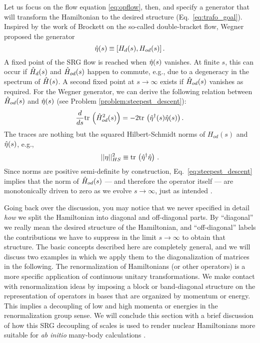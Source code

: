 {Let us focus on the flow equation \eqref{eq:opflow}, then, and specify a
generator that will transform the Hamiltonian to the desired structure 
(Eq.~\eqref{eq:trafo_goal}). Inspired by the work of Brockett \cite{Brockett:1991kx} 
on the so-called double-bracket flow, Wegner \cite{Wegner:1994dk} proposed the generator
\begin{equation}\label{eq:def_Wegner_general}
  \etaO(s) \equiv \comm{H_d(s)}{H_{od}(s)}\,.
\end{equation}
A fixed point of the SRG flow is reached when $\hat{\eta}(s)$ vanishes. At finite $s$, this 
can occur if $\hat{H}_d(s)$ and $\hat{H}_{od}(s)$ happen to commute, e.g., due to a degeneracy 
in the spectrum of $\hat{H}(s)$. A second fixed point at $s\to\infty$ exists if $\hat{H}_{od}(s)$ 
vanishes as required. For the Wegner generator, we can derive the following relation
between $\hat{H}_{od}(s)$ and $\hat{\eta}(s)$ (see Problem \ref{problem:steepest_descent}):
\begin{equation} \label{eq:steepest_descent}
  \totd{}{s}\tr\left(\HO^2_{od}(s)\right) = -2 \tr\left(\etaO^\dag(s)\etaO(s)\right).
\end{equation}
The traces are nothing but the squared Hilbert-Schmidt norms of $H_{od}(s)$ and $\hat{\eta}(s)$,
e.g.,
\begin{equation}
  ||\eta||^2_{HS}\equiv\mathrm{tr}\,\left(\hat{\eta}^\dag\hat{\eta}\right)\,.
\end{equation}
Since norms are positive semi-definite by construction, Eq.~\eqref{eq:steepest_descent} 
implies that the norm of $\hat{H}_{od}(s)$ --- and therefore the operator itself --- are 
monotonically driven to zero as we evolve $s\to\infty$, just as intended 
\cite{Wegner:1994dk,Kehrein:2006kx}.

Going back over the discussion, you may notice that we never specified in
detail \emph{how} we split the Hamiltonian into diagonal and off-diagonal
parts. By ``diagonal'' we really mean the desired structure of the Hamiltonian, 
and ``off-diagonal'' labels the contributions we have to suppress in the
limit $s\to\infty$ to obtain that structure. The basic concepts described
here are completely general, and we will discuss two examples in which we
apply them to the diagonalization of matrices in the following.
The renormalization of Hamiltonians (or other operators) is a more specific 
application of continuous unitary transformations. We make contact with 
renormalization ideas by imposing a block or band-diagonal structure on
the representation of operators in bases that are organized by momentum
or energy. This implies a decoupling of low and high momenta or energies
in the renormalization group sense. We will conclude this section with a
brief discussion of how this SRG decoupling of scales is used to render  
nuclear Hamiltonians more suitable for \emph{ab initio} many-body 
calculations \cite{Bogner:2007od,Bogner:2010pq,Morris:2015ve,Hergert:2016jk,Hergert:2017kx}.


}
